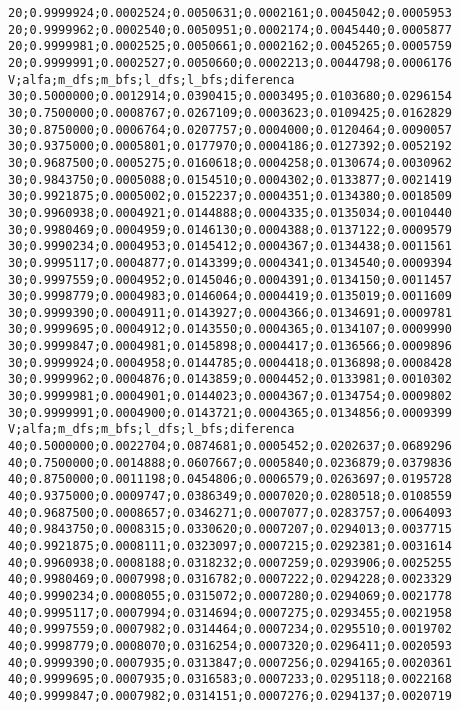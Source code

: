 \documentclass[brazil,times]{abnt}
\begin{document}
{\begin{verbatim}
20;0.9999924;0.0002524;0.0050631;0.0002161;0.0045042;0.0005953
20;0.9999962;0.0002540;0.0050951;0.0002174;0.0045440;0.0005877
20;0.9999981;0.0002525;0.0050661;0.0002162;0.0045265;0.0005759
20;0.9999991;0.0002527;0.0050660;0.0002213;0.0044798;0.0006176
V;alfa;m_dfs;m_bfs;l_dfs;l_bfs;diferenca
30;0.5000000;0.0012914;0.0390415;0.0003495;0.0103680;0.0296154
30;0.7500000;0.0008767;0.0267109;0.0003623;0.0109425;0.0162829
30;0.8750000;0.0006764;0.0207757;0.0004000;0.0120464;0.0090057
30;0.9375000;0.0005801;0.0177970;0.0004186;0.0127392;0.0052192
30;0.9687500;0.0005275;0.0160618;0.0004258;0.0130674;0.0030962
30;0.9843750;0.0005088;0.0154510;0.0004302;0.0133877;0.0021419
30;0.9921875;0.0005002;0.0152237;0.0004351;0.0134380;0.0018509
30;0.9960938;0.0004921;0.0144888;0.0004335;0.0135034;0.0010440
30;0.9980469;0.0004959;0.0146130;0.0004388;0.0137122;0.0009579
30;0.9990234;0.0004953;0.0145412;0.0004367;0.0134438;0.0011561
30;0.9995117;0.0004877;0.0143399;0.0004341;0.0134540;0.0009394
30;0.9997559;0.0004952;0.0145046;0.0004391;0.0134150;0.0011457
30;0.9998779;0.0004983;0.0146064;0.0004419;0.0135019;0.0011609
30;0.9999390;0.0004911;0.0143927;0.0004366;0.0134691;0.0009781
30;0.9999695;0.0004912;0.0143550;0.0004365;0.0134107;0.0009990
30;0.9999847;0.0004981;0.0145898;0.0004417;0.0136566;0.0009896
30;0.9999924;0.0004958;0.0144785;0.0004418;0.0136898;0.0008428
30;0.9999962;0.0004876;0.0143859;0.0004452;0.0133981;0.0010302
30;0.9999981;0.0004901;0.0144023;0.0004367;0.0134754;0.0009802
30;0.9999991;0.0004900;0.0143721;0.0004365;0.0134856;0.0009399
V;alfa;m_dfs;m_bfs;l_dfs;l_bfs;diferenca
40;0.5000000;0.0022704;0.0874681;0.0005452;0.0202637;0.0689296
40;0.7500000;0.0014888;0.0607667;0.0005840;0.0236879;0.0379836
40;0.8750000;0.0011198;0.0454806;0.0006579;0.0263697;0.0195728
40;0.9375000;0.0009747;0.0386349;0.0007020;0.0280518;0.0108559
40;0.9687500;0.0008657;0.0346271;0.0007077;0.0283757;0.0064093
40;0.9843750;0.0008315;0.0330620;0.0007207;0.0294013;0.0037715
40;0.9921875;0.0008111;0.0323097;0.0007215;0.0292381;0.0031614
40;0.9960938;0.0008188;0.0318232;0.0007259;0.0293906;0.0025255
40;0.9980469;0.0007998;0.0316782;0.0007222;0.0294228;0.0023329
40;0.9990234;0.0008055;0.0315072;0.0007280;0.0294069;0.0021778
40;0.9995117;0.0007994;0.0314694;0.0007275;0.0293455;0.0021958
40;0.9997559;0.0007982;0.0314464;0.0007234;0.0295510;0.0019702
40;0.9998779;0.0008070;0.0316254;0.0007320;0.0296411;0.0020593
40;0.9999390;0.0007935;0.0313847;0.0007256;0.0294165;0.0020361
40;0.9999695;0.0007935;0.0316583;0.0007233;0.0295118;0.0022168
40;0.9999847;0.0007982;0.0314151;0.0007276;0.0294137;0.0020719

\end{verbatim}}
\end{document}
